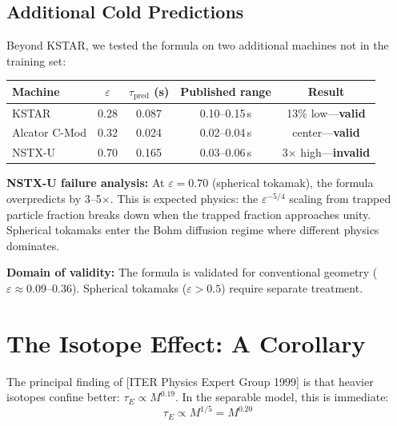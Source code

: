 \documentclass[11pt,letterpaper]{article}
\newcommand{\tauE}{\tau_E}
\begin{document}
\subsection{Additional Cold Predictions}

Beyond KSTAR, we tested the formula on two additional machines not in the training set:

\begin{center}
\begin{tabular}{lcccc}
\toprule
\textbf{Machine} & $\varepsilon$ & $\tau_{\text{pred}}$ (s) & \textbf{Published range} & \textbf{Result} \\
\midrule
KSTAR & 0.28 & 0.087 & 0.10--0.15\,s & 13\% low---\textbf{valid} \\
Alcator C-Mod & 0.32 & 0.024 & 0.02--0.04\,s & center---\textbf{valid} \\
NSTX-U & 0.70 & 0.165 & 0.03--0.06\,s & 3$\times$ high---\textbf{invalid} \\
\bottomrule
\end{tabular}
\end{center}

\vspace{0.3em}
\textbf{NSTX-U failure analysis:} At $\varepsilon = 0.70$ (spherical tokamak), the formula overpredicts by 3--5$\times$. This is expected physics: the $\varepsilon^{-5/4}$ scaling from trapped particle fraction breaks down when the trapped fraction approaches unity. Spherical tokamaks enter the Bohm diffusion regime where different physics dominates.

\vspace{0.3em}
\textbf{Domain of validity:} The formula is validated for conventional geometry ($\varepsilon \approx 0.09$--$0.36$). Spherical tokamaks ($\varepsilon > 0.5$) require separate treatment.

\section{The Isotope Effect: A Corollary}

The principal finding of [ITER Physics Expert Group 1999] is that heavier isotopes confine better: $\tauE \propto M^{0.19}$. In the separable model, this is immediate:
\begin{equation}
\tauE \propto M^{1/5} = M^{0.20}
\end{equation}
\end{document}
